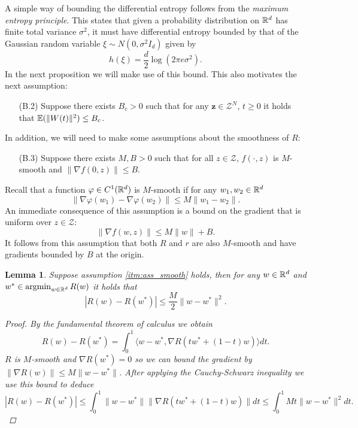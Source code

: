 \documentclass{article}
\makeatletter
\newtheorem{lemma}[theorem]{Lemma}
\def\namedlabel#1#2{\begingroup
    #2%
    \def\@currentlabel{#2}%
    \label{#1}\endgroup
}
\newcommand{\Bbf}[1]{\mathbf{#1}}
\newcommand{\Bcal}[1]{\mathcal{#1}}
\makeatother
\begin{document}
A simple way of bounding the differential entropy follows from the \textit{maximum entropy principle}. This states that given a probability distribution on \(\Bbb{R}^d\) has finite total variance \(\sigma^2\), it must have differential entropy bounded by that of the Gaussian random variable \(\xi \sim N(0, \sigma^2 I_d)\) given by
\begin{equation}\label{eq:gaus_ent}
    h(\xi) = \frac{d}{2} \log(2\pi e \sigma^2).
\end{equation}
In the next proposition we will make use of this bound. This also motivates the next assumption:
\begin{enumerate}
    \item[\namedlabel{itm:ass_var_cts}{(B.2)}] Suppose there exists \(B_c > 0\) such that for any \(\Bbf{z} \in \Bcal{Z}^N\), \(t \geq 0\) it holds that \(\Bbb{E}(\|W(t)\|^2) \leq B_c\).
\end{enumerate}
In addition, we will need to make some assumptions about the smoothness of \(R\):
\begin{enumerate}
    \item[\namedlabel{itm:ass_smooth}{(B.3)}] Suppose there exists \(M, B > 0\) such that for all \(z \in \Bcal{Z}\), \(f(\cdot, z)\) is \(M\)-smooth and \(\|\nabla f(0, z)\| \leq B\).
\end{enumerate}
Recall that a function \(\varphi \in C^1(\Bbb{R}^d)\) is \(M\)-smooth if for any \(w_1, w_2 \in \Bbb{R}^d\)
\begin{equation*}
    \|\nabla \varphi(w_1) - \nabla \varphi(w_2)\| \leq M \|w_1 - w_2\|.
\end{equation*}
An immediate consequence of this assumption is a bound on the gradient that is uniform over \(z \in \Bcal{Z}\):
\begin{equation}\label{eq:grad_bounds}
    \| \nabla f(w, z) \| \leq M \|w\| + B.
\end{equation}
It follows from this assumption that both \(R\) and \(r\) are also \(M\)-smooth and have gradients bounded by \(B\) at the origin.

\begin{lemma}\label{lem:quadratic_bounds}
Suppose assumption \ref{itm:ass_smooth} holds, then for any \(w \in \Bbb{R}^d\) and \(w^* \in \operatorname{argmin}_{w \in \Bbb{R}^d} R(w)\) it holds that
\begin{equation*}
    |R(w) - R(w^*)| \leq \frac{M}{2} \| w - w^* \|^2.
\end{equation*}
\begin{proof}
By the fundamental theorem of calculus we obtain
\begin{equation*}
    R(w) - R(w^*) = \int_0^1 \langle w - w^*, \nabla R(tw^* + (1-t) w) \rangle dt.
\end{equation*}
\(R\) is \(M\)-smooth and \(\nabla R(w^*) = 0\) so we can bound the gradient by \(\|\nabla R(w)\| \leq M \|w - w^*\|\). After applying the Cauchy-Schwarz inequality we use this bound to deduce
\begin{equation*}
    |R(w) - R(w^*)| \leq \int_0^1 \|w-w^*\| \|\nabla R(tw^* + (1-t)w)\|dt \leq \int_0^1 Mt \|w - w^*\|^2 dt.
\end{equation*}
\end{proof}
\end{lemma}
\end{document}
